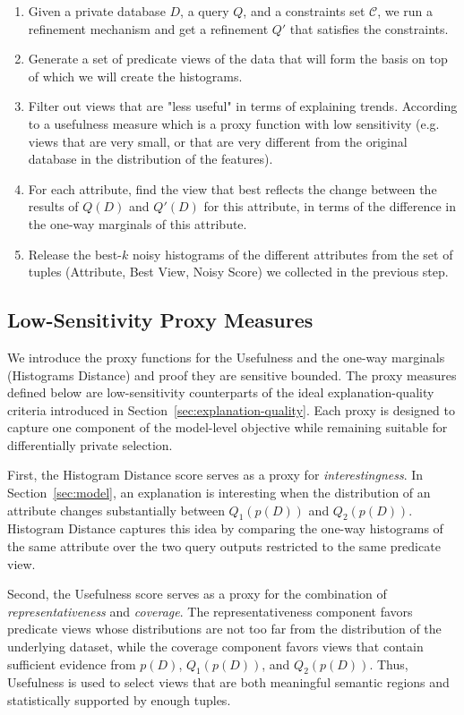 \begin{enumerate}
    \item Given a private database $D$, a query $Q$, and a constraints set $\mathcal{C}$, we run a refinement mechanism and get a refinement $Q'$ that satisfies the constraints.
    \item Generate a set of predicate views of the data that will form the basis on top of which we will create the histograms.
    \item Filter out views that are "less useful" in terms of explaining trends. According to a usefulness measure which is a proxy function with low sensitivity (e.g. views that are very small, or that are very different from the original database in the distribution of the features). 
    \item For each attribute, find the view that best reflects the change between the results of $Q(D)$ and $Q'(D)$ for this attribute, in terms of the difference in the one-way marginals of this attribute.
    \item Release the best-$k$ noisy histograms of the different attributes from the set of tuples (Attribute, Best View, Noisy Score) we collected in the previous step.
\end{enumerate}

\subsection{Low-Sensitivity Proxy Measures}
We introduce the proxy functions for the Usefulness and the one-way marginals (Histograms Distance) and proof they are sensitive bounded.
The proxy measures defined below are low-sensitivity counterparts of the
ideal explanation-quality criteria introduced in Section~\ref{sec:explanation-quality}.
Each proxy is designed to capture one component of the model-level
objective while remaining suitable for differentially private selection.

First, the Histogram Distance score serves as a proxy for
\emph{interestingness}. In Section~\ref{sec:model}, an explanation is
interesting when the distribution of an attribute changes substantially
between $Q_1(p(D))$ and $Q_2(p(D))$. Histogram Distance captures this
idea by comparing the one-way histograms of the same attribute over the
two query outputs restricted to the same predicate view.

Second, the Usefulness score serves as a proxy for the combination of
\emph{representativeness} and \emph{coverage}. The representativeness
component favors predicate views whose distributions are not too far
from the distribution of the underlying dataset, while the coverage
component favors views that contain sufficient evidence from
$p(D)$, $Q_1(p(D))$, and $Q_2(p(D))$. Thus, Usefulness is used to select
views that are both meaningful semantic regions and statistically
supported by enough tuples.

